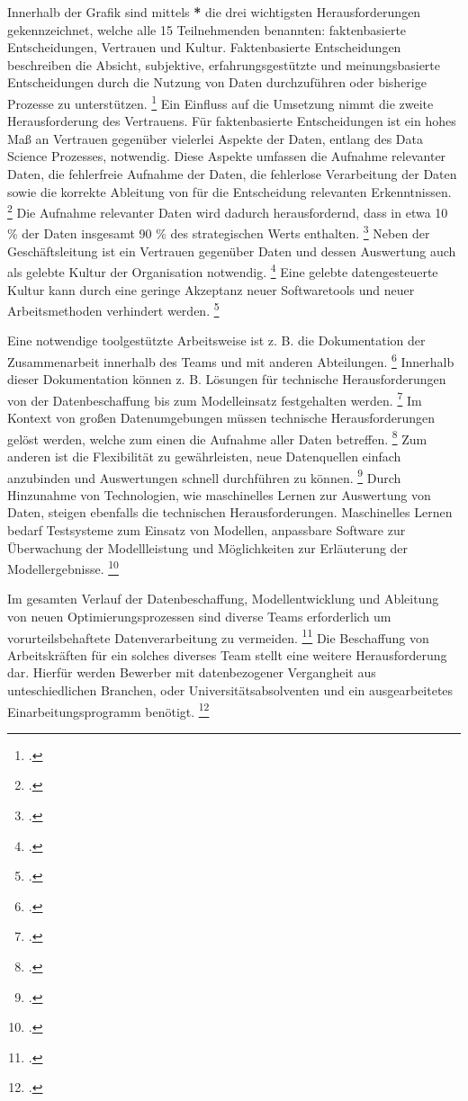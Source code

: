Innerhalb der Grafik sind mittels \textbf{*} die drei wichtigsten Herausforderungen gekennzeichnet, welche alle 15 Teilnehmenden benannten: faktenbasierte Entscheidungen, Vertrauen und Kultur.
Faktenbasierte Entscheidungen beschreiben die Absicht, subjektive, erfahrungsgestützte und meinungsbasierte Entscheidungen durch die Nutzung von Daten durchzuführen oder bisherige Prozesse zu unterstützen. \footcite[Vgl.][S. 9]{Dalpiaz.2020}
Ein Einfluss auf die Umsetzung nimmt die zweite Herausforderung des Vertrauens.
Für faktenbasierte Entscheidungen ist ein hohes Maß an Vertrauen gegenüber vielerlei Aspekte der Daten, entlang des Data Science Prozesses, notwendig.
Diese Aspekte umfassen die Aufnahme relevanter Daten, die fehlerfreie Aufnahme der Daten, die fehlerlose Verarbeitung der Daten sowie die korrekte Ableitung von für die Entscheidung relevanten Erkenntnissen. \footcite[Vgl.][S. 10]{Dalpiaz.2020}
Die Aufnahme relevanter Daten wird dadurch herausfordernd, dass in etwa 10 \% der Daten insgesamt 90 \% des strategischen Werts enthalten. \footcite[Vgl.][S. 3]{Pratt.2023}
Neben der Geschäftsleitung ist ein Vertrauen gegenüber Daten und dessen Auswertung auch als gelebte Kultur der Organisation notwendig. \footcite[Vgl.][S. 4]{Dalpiaz.2020}
Eine gelebte datengesteuerte Kultur kann durch eine geringe Akzeptanz neuer Softwaretools und neuer Arbeitsmethoden verhindert werden. \footcite[Vgl.][S. 15]{Dalpiaz.2020}

Eine notwendige toolgestützte Arbeitsweise ist z. B. die Dokumentation der Zusammenarbeit innerhalb des Teams und mit anderen Abteilungen. \footcite[Vgl.][S. 12]{Zhang.2020b}
Innerhalb dieser Dokumentation können z. B. Lösungen für technische Herausforderungen von der Datenbeschaffung bis zum Modelleinsatz festgehalten werden. \footcite[Vgl.][S. 23]{Grossman.2014}
Im Kontext von großen Datenumgebungen müssen technische Herausforderungen gelöst werden, welche zum einen die Aufnahme aller Daten betreffen. \footcite[Vgl.][S. 217]{Elgendy.2014}
Zum anderen ist die Flexibilität zu gewährleisten, neue Datenquellen einfach anzubinden und Auswertungen schnell durchführen zu können. \footcite[Vgl.][S. 217]{Elgendy.2014}
Durch Hinzunahme von Technologien, wie maschinelles Lernen zur Auswertung von Daten, steigen ebenfalls die technischen Herausforderungen.
Maschinelles Lernen bedarf Testsysteme zum Einsatz von Modellen, anpassbare Software zur Überwachung der Modellleistung und Möglichkeiten zur Erläuterung der Modellergebnisse. \footcite[Vgl.][S. 1]{Nahar.2022}

Im gesamten Verlauf der Datenbeschaffung, Modellentwicklung und Ableitung von neuen Optimierungsprozessen sind diverse Teams erforderlich um vorurteilsbehaftete Datenverarbeitung zu vermeiden. \footcite[Vgl.][S. 18]{Zhang.2020b}
Die Beschaffung von Arbeitskräften für ein solches diverses Team stellt eine weitere Herausforderung dar. 
Hierfür werden Bewerber mit datenbezogener Vergangheit aus unteschiedlichen Branchen, oder Universitätsabsolventen und ein ausgearbeitetes Einarbeitungsprogramm benötigt. \footcite[Vgl.][S. 13]{Patil.2011}

